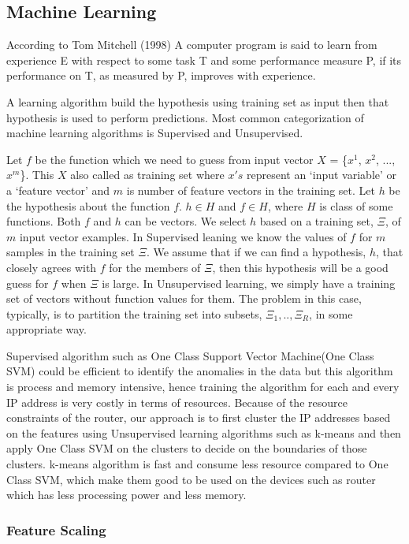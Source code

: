 \documentclass[12pt,oneside,a4paper]{article}
\begin{document}
\subsection{Machine Learning}

According to Tom Mitchell (1998) A computer program is said to learn from experience E with respect to some task T and some performance measure P, if its performance on T, as measured by P, improves with experience.

A learning algorithm build the hypothesis using training set as input then that hypothesis is used to perform predictions. Most common categorization of machine learning algorithms is Supervised and Unsupervised.

Let $f$ be the function which we need to guess from input vector $X$ = \{$x^{1}$, $x^{2}$, ..., $x^{m}$\}. This $X$ also called as training set where $x's$ represent an `input variable' or a `feature vector' and $m$ is number of feature vectors in the training set. Let $h$ be the hypothesis about the function $f$. $h \in H$ and $f \in H$, where $H$ is class of some functions. Both $f$ and $h$ can be vectors. We select $h$ based on a training set, $\Xi$, of $m$ input vector examples. In Supervised leaning we know the values of $f$ for $m$ samples in the training set
$\Xi$. We assume that if we can find a hypothesis, $h$, that closely agrees with $f$ for the members of $\Xi$, then this hypothesis will be a good guess for $f$ when $\Xi$ is large. In Unsupervised learning, we simply have a training set of vectors without function values for them. The problem in this case, typically, is to partition the training set into subsets, $\Xi_1,.. ,\Xi_R$, in some appropriate way.\cite{machine-learning}

Supervised algorithm such as One Class Support Vector Machine(One Class SVM)\cite{svm} could be efficient to identify the anomalies in the data but this algorithm is process and memory intensive, hence training the algorithm for each and every IP address is very costly in terms of resources. Because of the resource constraints of the router, our approach is to first cluster the IP addresses based on the features using Unsupervised learning algorithms such as k-means and then apply One Class SVM on the clusters to decide on the boundaries of those clusters. k-means algorithm is fast and consume less resource compared to One Class SVM, which make them good to be used on the devices such as router which has less processing power and less memory.

\subsubsection{Feature Scaling}
\end{document}
